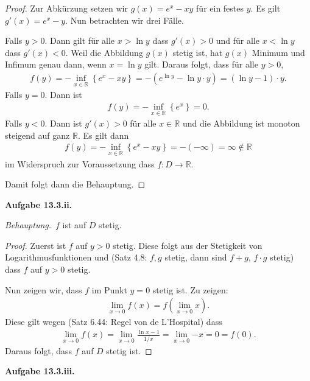 \documentclass[draft,a5paper]{article}
\newcommand{\beh}{\textit{Behauptung.}\ }
\newcommand{\aufgn}[1]{\textbf{Aufgabe #1.}}
\newcommand{\mg}[1]{\mathbb{#1}}
\begin{document}
\begin{proof}
Zur Abkürzung setzen wir \(g(x) = e^x - xy\) für ein
festes \(y\).  Es gilt \(g'(x) = e^x - y\).  Nun betrachten
wir drei Fälle.

Falls \(y > 0\).  Dann gilt für alle \(x > \ln y\) dass
\(g'(x) > 0\) und für alle \(x < \ln y\) dass \(g'(x) < 0\).
Weil die Abbildung \(g(x)\) stetig ist, hat \(g(x)\) Minimum
und Infimum genau dann, wenn \(x = \ln y\) gilt.  Daraus
folgt, dass für alle \(y > 0\),
\begin{align*}
  f(y)
  = - \inf_{x \in \mg{R}} \left\{ e^x - xy \right\}
  = - (e^{\ln y} - \ln y \cdot y) = (\ln y - 1) \cdot y.
\end{align*}
Falls \(y = 0\).  Dann ist
\begin{align*}
  f(y)
  = - \inf_{x \in \mg{R}} \left\{ e^x \right\}
  = 0.
\end{align*}
Falls \(y < 0\).  Dann ist \(g'(x) > 0\) für alle $x \in
\mg{R}$ und die Abbildung ist monoton steigend auf ganz
\(\mg{R}\).  Es gilt dann
\begin{align*}
  f(y) = - \inf_{x \in \mg{R}} \left\{ e^x - xy \right\}
  = - ( - \infty) = \infty \notin \mg{R}
\end{align*}
im Widerspruch zur Voraussetzung dass $f \colon D \to
\mg{R}$.

Damit folgt dann die Behauptung.
\end{proof}

\aufgn{13.3.ii}

\beh \(f\) ist auf \(D\) stetig.

\begin{proof}
Zuerst ist \(f\) auf \(y > 0\) stetig.  Diese folgt aus der
Stetigkeit von Logarithmusfunktionen und (Satz 4.8:
\(f,g\) stetig, dann sind \(f + g\), \(f \cdot g\) stetig)
dass \(f\) auf \(y > 0\) stetig.

Nun zeigen wir, dass \(f\) im Punkt \(y = 0\) stetig ist.
Zu zeigen:
\begin{align*}
\lim_{x \to 0}{f(x)} = f \left( \lim_{x \to 0}{x} \right).
\end{align*}
Diese gilt wegen (Satz 6.44: Regel von de L'Hospital)
dass
\begin{align*}
\lim_{x \to 0}{f(x)} = \lim_{x \to 0}{\frac{\ln x -
  1}{1/x}} = \lim_{x \to 0}{-x} = 0 = f(0).
\end{align*}
Daraus folgt, dass \(f\) auf \(D\) stetig ist.
\end{proof}

\aufgn{13.3.iii}
\end{document}
